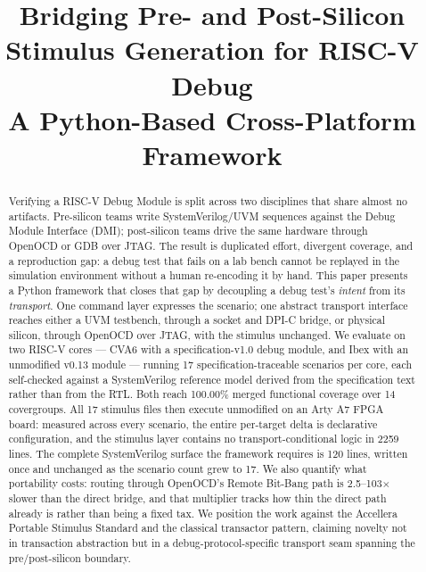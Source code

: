 \documentclass[conference]{IEEEtran}
\begin{document}
\title{Bridging Pre- and Post-Silicon Stimulus Generation for RISC-V Debug\\
{\large A Python-Based Cross-Platform Framework}}

\author{
\and
{}
}

\maketitle

\begin{abstract}
Verifying a RISC-V Debug Module is split across two disciplines that share almost no artifacts. Pre-silicon teams write SystemVerilog/UVM sequences against the Debug Module Interface (DMI); post-silicon teams drive the same hardware through OpenOCD or GDB over JTAG. The result is duplicated effort, divergent coverage, and a reproduction gap: a debug test that fails on a lab bench cannot be replayed in the simulation environment without a human re-encoding it by hand. This paper presents a Python framework that closes that gap by decoupling a debug test's \textit{intent} from its \textit{transport}. One command layer expresses the scenario; one abstract transport interface reaches either a UVM testbench, through a socket and DPI-C bridge, or physical silicon, through OpenOCD over JTAG, with the stimulus unchanged. We evaluate on two RISC-V cores --- CVA6 with a specification-v1.0 debug module, and Ibex with an unmodified v0.13 module --- running 17 specification-traceable scenarios per core, each self-checked against a SystemVerilog reference model derived from the specification text rather than from the RTL. Both reach 100.00\% merged functional coverage over 14 covergroups. All 17 stimulus files then execute unmodified on an Arty A7 FPGA board: measured across every scenario, the entire per-target delta is declarative configuration, and the stimulus layer contains no transport-conditional logic in 2259 lines. The complete SystemVerilog surface the framework requires is 120 lines, written once and unchanged as the scenario count grew to 17. We also quantify what portability costs: routing through OpenOCD's Remote Bit-Bang path is 2.5--103$\times$ slower than the direct bridge, and that multiplier tracks how thin the direct path already is rather than being a fixed tax. We position the work against the Accellera Portable Stimulus Standard and the classical transactor pattern, claiming novelty not in transaction abstraction but in a debug-protocol-specific transport seam spanning the pre/post-silicon boundary.
\end{abstract}
\end{document}
